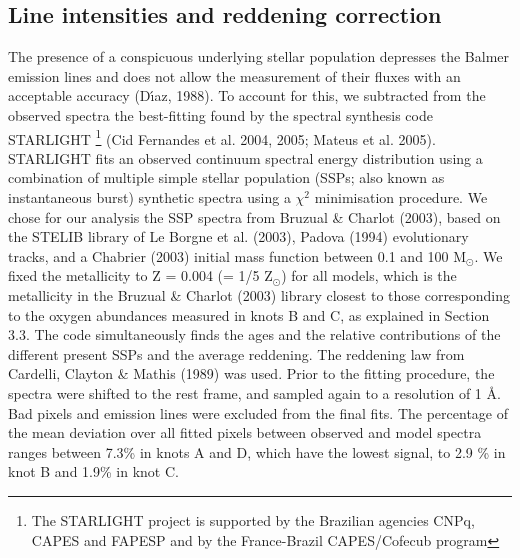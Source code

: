 \documentclass[structabstract]{aa}
\begin{document}
\subsection{Line intensities and reddening correction}

The presence of a conspicuous underlying stellar population depresses the Balmer emission lines and does not allow the measurement of their 
fluxes with an acceptable accuracy (D\'\i az, 1988).
To account for this, we subtracted from the observed spectra the best-fitting found by the spectral synthesis code STARLIGHT
\footnote{The STARLIGHT project is supported by the Brazilian agencies CNPq, CAPES and FAPESP and by the France-Brazil CAPES/Cofecub program} (Cid Fernandes et al. 2004, 2005; Mateus
et al. 2005). STARLIGHT fits an observed continuum spectral energy distribution using a combination of multiple simple stellar population (SSPs; also known as instantaneous burst) synthetic spectra using a $\chi^2$ minimisation procedure.
We chose for our analysis the SSP spectra from Bruzual \& Charlot (2003), based on
the STELIB library of Le Borgne et al. (2003), Padova (1994) evolutionary tracks, and a Chabrier (2003)
initial mass function between 0.1 and 100 M$_\odot$. We fixed the metallicity to Z = 0.004 (= 1/5 Z$_\odot$) for all models, which is the metallicity in the Bruzual \& Charlot (2003) library closest to those corresponding to the oxygen abundances measured in knots B and C, as explained in Section 3.3. The code simultaneously finds the ages and the relative contributions of the different present SSPs and the average reddening. The reddening law from Cardelli, Clayton \& Mathis (1989)  was used. Prior to the fitting procedure, the spectra were shifted to the rest frame, and sampled again to a resolution of 1 {\AA}. Bad pixels and emission lines were excluded from the final fits. The percentage of
the mean deviation over all fitted pixels between observed and model spectra ranges between 7.3\% in
knots A and D, which have the lowest signal, to 2.9 \% in knot B and 1.9\% in knot C.
\end{document}
